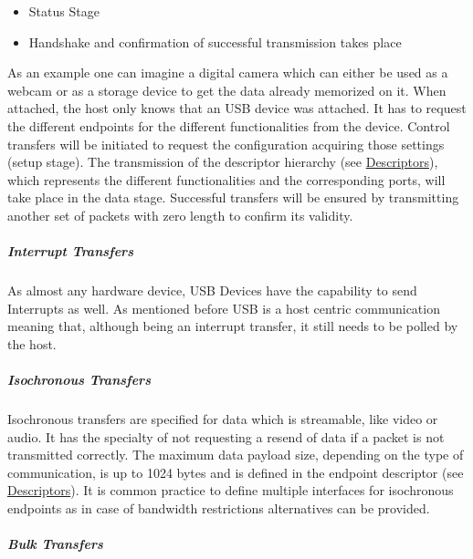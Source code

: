 \begin{itemize}
\tightlist
\item
  {Status Stage}
\end{itemize}

\begin{itemize}
\tightlist
\item
  {Handshake and confirmation of successful transmission takes place}
\end{itemize}

{As an example one can imagine a digital camera which can either be used
as a webcam or as a storage device to get the data already memorized on
it. When attached, the host only knows that an USB device was attached.
It has to request the different endpoints for the different
functionalities from the device. Control transfers will be initiated to
request the configuration acquiring those settings (setup stage). The
transmission of the descriptor hierarchy (see
}{\protect\hyperlink{h.c8rxmh3196o7}{Descriptors}}{), which represents
the different functionalities and the corresponding ports, will take
place in the data stage. Successful transfers will be ensured by
transmitting another set of packets with zero length to confirm its
validity.}

\hypertarget{h.nxp3faj0xgfy}{\subparagraph{\texorpdfstring{{Interrupt
Transfers}}{Interrupt Transfers}}\label{h.nxp3faj0xgfy}}

{As almost any hardware device, USB Devices have the capability to send
Interrupts as well. As mentioned before USB is a host centric
communication meaning that, although being an interrupt transfer, it
still needs to be polled by the host. }

\hypertarget{h.icibxq66s779}{\subparagraph{\texorpdfstring{{Isochronous
Transfers}}{Isochronous Transfers}}\label{h.icibxq66s779}}

{Isochronous transfers are specified for data which is streamable, like
video or audio. It has the specialty of not requesting a resend of data
if a packet is not transmitted correctly. The maximum data payload size,
depending on the type of communication, is up to 1024 bytes and is
defined in the endpoint descriptor (see
}{\protect\hyperlink{h.c8rxmh3196o7}{Descriptors}}{). It is common
practice to define multiple interfaces for isochronous endpoints as in
case of bandwidth restrictions alternatives can be provided.}

\hypertarget{h.3yadg7wz9shv}{\subparagraph{\texorpdfstring{{Bulk
Transfers}}{Bulk Transfers}}\label{h.3yadg7wz9shv}}

